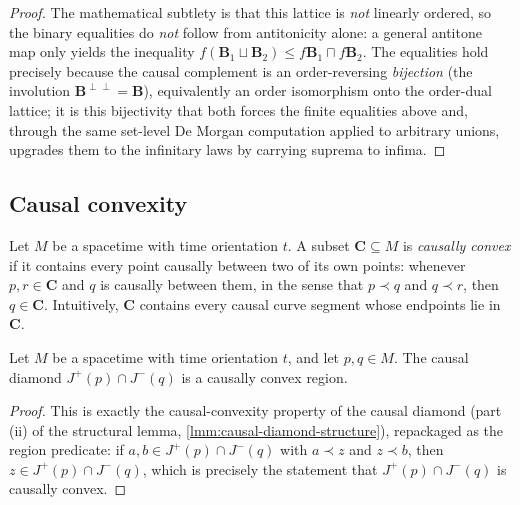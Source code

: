 \begin{proof}
    The mathematical subtlety is that this lattice is \emph{not} linearly ordered, so the binary equalities do \emph{not} follow from antitonicity alone: a general antitone map only yields the inequality $f(\mathbf{B}_1 \sqcup \mathbf{B}_2) \le f\mathbf{B}_1 \sqcap f\mathbf{B}_2$. The equalities hold precisely because the causal complement is an order-reversing \emph{bijection} (the involution $\mathbf{B}^{\perp\perp} = \mathbf{B}$), equivalently an order isomorphism onto the order-dual lattice; it is this bijectivity that both forces the finite equalities above and, through the same set-level De Morgan computation applied to arbitrary unions, upgrades them to the infinitary laws by carrying suprema to infima.
\end{proof}

\medskip

\subsection{Causal convexity}

\begin{definition}
    \label{def:causally-convex-region}
    \leanok
    Let $M$ be a spacetime with time orientation $t$. A subset $\mathbf{C} \subseteq M$ is \emph{causally convex} if it contains every point causally between two of its own points: whenever $p, r \in \mathbf{C}$ and $q$ is causally between them, in the sense that $p \prec q$ and $q \prec r$, then $q \in \mathbf{C}$. Intuitively, $\mathbf{C}$ contains every causal curve segment whose endpoints lie in $\mathbf{C}$.
\end{definition}

\medskip

\begin{lemma}
    \label{lmm:causal-diamond-causally-convex}
    \leanok
    Let $M$ be a spacetime with time orientation $t$, and let $p, q \in M$. The causal diamond $J^+(p) \cap J^-(q)$ is a causally convex region.
\end{lemma}
\begin{proof}
    \leanok
    This is exactly the causal-convexity property of the causal diamond (part (ii) of the structural lemma, \ref{lmm:causal-diamond-structure}), repackaged as the region predicate: if $a, b \in J^+(p) \cap J^-(q)$ with $a \prec z$ and $z \prec b$, then $z \in J^+(p) \cap J^-(q)$, which is precisely the statement that $J^+(p) \cap J^-(q)$ is causally convex.
\end{proof}

